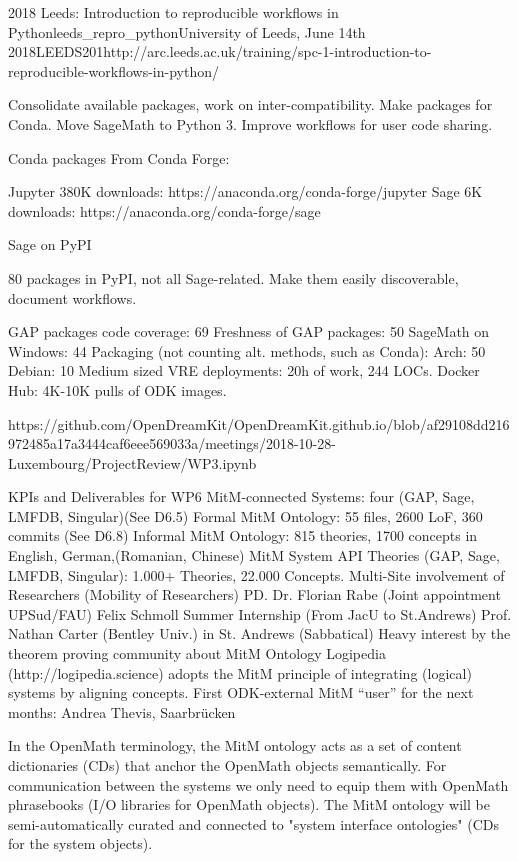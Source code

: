 \begin{Aim 1}
\begin{Aim 2}
\begin{event}{2018 Leeds: Introduction to reproducible workflows in Python}{leeds_repro_python}{University of Leeds, June 14th 2018}{LEEDS}{20}{1}{http://arc.leeds.ac.uk/training/spc-1-introduction-to-reproducible-workflows-in-python/}
\begin{itemize}
         Consolidate available packages, work on inter-compatibility.
         Make packages for Conda.
         Move SageMath to Python 3.
         Improve workflows for user code sharing.

         Conda packages From Conda Forge:

         Jupyter 380K downloads: https://anaconda.org/conda-forge/jupyter
         Sage 6K downloads: https://anaconda.org/conda-forge/sage

         Sage on PyPI

         80 packages in PyPI, not all Sage-related.
         Make them easily discoverable, document workflows.
         
         GAP packages code coverage: 69%
Freshness of GAP packages: 50%
SageMath on Windows: 44%
Packaging (not counting alt. methods, such as Conda):
Arch: 50%
Debian: 10%
Medium sized VRE deployments: 20h of work, 244 LOCs.
Docker Hub: 4K-10K pulls of ODK images.

https://github.com/OpenDreamKit/OpenDreamKit.github.io/blob/af29108dd216972485a17a3444caf6eee569033a/meetings/2018-10-28-Luxembourg/ProjectReview/WP3.ipynb

KPIs and Deliverables for WP6
MitM-connected Systems: four (GAP, Sage, LMFDB, Singular)(See D6.5)
Formal MitM Ontology: 55 files, 2600 LoF, 360 commits (See D6.8)
Informal MitM Ontology: 815 theories, 1700 concepts in English, German,(Romanian, Chinese)
MitM System API Theories (GAP, Sage, LMFDB, Singular): 1.000+ Theories, 22.000 Concepts.
Multi-Site involvement of Researchers (Mobility of Researchers)
PD. Dr. Florian Rabe (Joint appointment UPSud/FAU)
Felix Schmoll Summer Internship (From JacU to St.Andrews)
Prof. Nathan Carter (Bentley Univ.) in St. Andrews (Sabbatical)
Heavy interest by the theorem proving community about MitM Ontology
Logipedia (http://logipedia.science) adopts the MitM principle of integrating (logical) systems by aligning concepts.
First ODK-external MitM “user” for the next months: Andrea Thevis, Saarbrücken 





In the OpenMath terminology, the MitM ontology acts as a set of content dictionaries (CDs) that anchor the OpenMath objects semantically. 
For communication between the systems we only need to equip them with OpenMath phrasebooks (I/O libraries for OpenMath objects). The MitM 
ontology will be semi-automatically curated and connected to "system interface ontologies" (CDs for the system objects).


\end{itemize}
\end{event}
\end{Aim 2}
\end{Aim 1}

